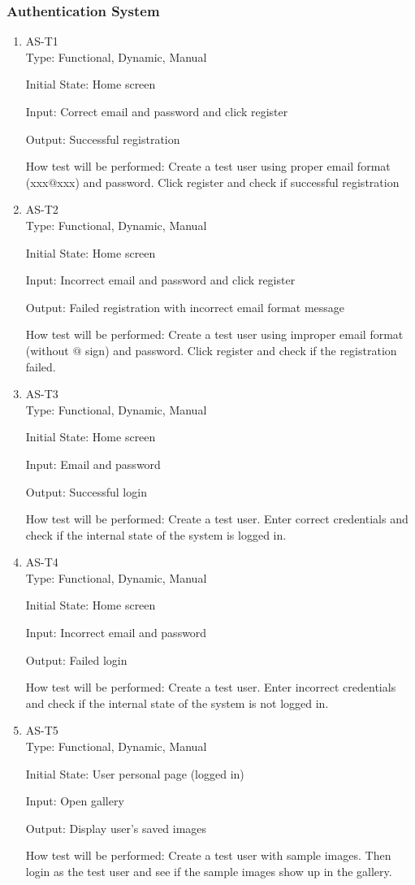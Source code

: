 \documentclass[12pt, titlepage]{article}
\begin{document}
\subsubsection{Authentication System}
\begin{enumerate}
\item{AS-T1}\\
Type: Functional, Dynamic, Manual
					
Initial State: Home screen
					
Input: Correct email and password and click register
					
Output: Successful registration
					
How test will be performed: Create a test user using proper email format (xxx$@$xxx) and password. Click register and check if successful registration

\item{AS-T2}\\
Type: Functional, Dynamic, Manual
					
Initial State: Home screen
					
Input: Incorrect email and password and click register
					
Output: Failed registration with incorrect email format message
					
How test will be performed: Create a test user using improper email format (without $@$ sign) and password. Click register and check if the registration failed.

\item{AS-T3}\\
Type: Functional, Dynamic, Manual
					
Initial State: Home screen
					
Input: Email and password
					
Output: Successful login
					
How test will be performed: Create a test user. Enter correct credentials and check if the internal state of the system is logged in.
					
\item{AS-T4}\\
Type: Functional, Dynamic, Manual
					
Initial State: Home screen
					
Input: Incorrect email and password
					
Output: Failed login
					
How test will be performed: Create a test user. Enter incorrect credentials and check if the internal state of the system is not logged in.

\item{AS-T5}\\
Type: Functional, Dynamic, Manual
					
Initial State: User personal page (logged in)
					
Input: Open gallery
					
Output: Display user's saved images
					
How test will be performed: Create a test user with sample images. Then login as the test user and see if the sample images show up in the gallery.
\end{enumerate}
\end{document}
